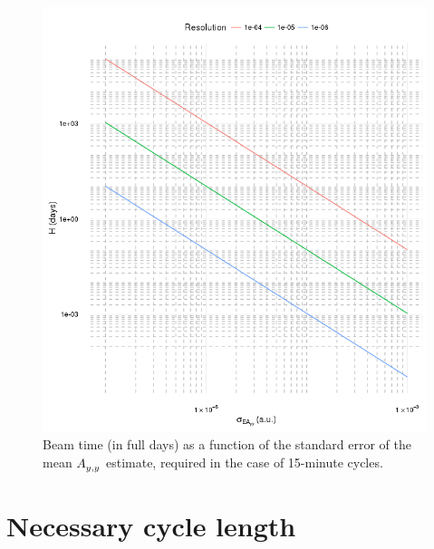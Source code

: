 \documentclass{article}
\begin{document}
\begin{figure}[h]
\centering
\includegraphics[scale=1]{BeamTime_15minCycle}
\caption{Beam time (in full days) as a function of the standard error of the mean $\Ayy$ estimate, required in the case of 15-minute cycles.}
\end{figure}

\section{Necessary cycle length}
\end{document}
